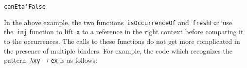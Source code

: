 \documentclass[9pt,preprint,authoryear]{sigplanconf}
\begin{document}
{{{}\vphantom{$\{$}}}\textcolor[rgb]{0,0,0.80}{\texttt{canEta}}\textcolor[rgb]{0,0,0.80}{\texttt{\mbox{\hspace{0.50em}}}}\textcolor[rgb]{0,0,0.80}{\texttt{\makebox[1.22ex][c]{\_{}}}}\textcolor[rgb]{0,0,0.80}{\texttt{\mbox{\hspace{0.50em}}}}\textcolor[cmyk]{0,0.65,0.99,0}{\texttt{{\char `\=}}}\textcolor[rgb]{0,0,0.80}{\texttt{\mbox{\hspace{0.50em}}}}\textcolor[rgb]{0.70,0.13,0.13}{\texttt{False}}\textcolor[rgb]{0,0,0.80}{\texttt{{\nopagebreak \newline%
}\vphantom{$\{$}}}%


%
In the above example, the two functions{~}\textcolor[rgb]{0,0,0.80}{\texttt{isOccurrenceOf}}    and{~}\textcolor[rgb]{0,0,0.80}{\texttt{freshFor}} use the{~}\textcolor[rgb]{0,0,0.80}{\texttt{inj}} function to lift{~}\textcolor[rgb]{0,0,0.80}{\texttt{x}} to
    a reference in the right context before comparing it to the
    occurrences. The calls to these functions do not get more complicated
    in the presence of multiple binders. For example, the code which
    recognizes the pattern{~}\textcolor[cmyk]{0,0.65,0.99,0}{\texttt{$ \lambda $}}\textcolor[rgb]{0,0,0.80}{\texttt{\mbox{\hspace{0.50em}}}}\textcolor[rgb]{0,0,0.80}{\texttt{x}}\textcolor[rgb]{0,0,0.80}{\texttt{\mbox{\hspace{0.50em}}}}\textcolor[rgb]{0,0,0.80}{\texttt{y}}\textcolor[rgb]{0,0,0.80}{\texttt{\mbox{\hspace{0.50em}}}}\textcolor[cmyk]{0,0.65,0.99,0}{\texttt{$ \rightarrow $}}\textcolor[rgb]{0,0,0.80}{\texttt{\mbox{\hspace{0.50em}}}}\textcolor[rgb]{0,0,0.80}{\texttt{e}}\textcolor[rgb]{0,0,0.80}{\texttt{\mbox{\hspace{0.50em}}}}\textcolor[rgb]{0,0,0.80}{\texttt{x}} is as follows{:}%


{\nopagebreak }
\end{document}
